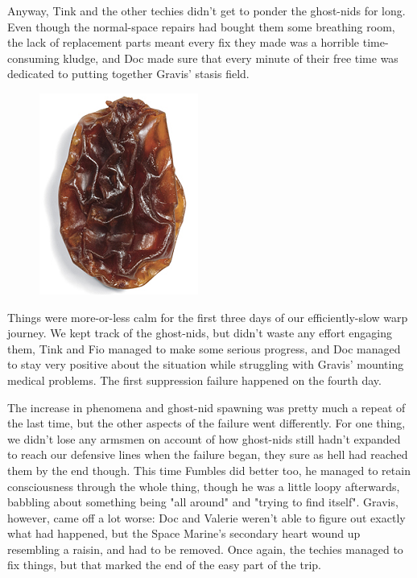 Anyway, Tink and the other techies didn't get to ponder the ghost-nids for long. 
Even though the normal-space repairs had bought them some breathing room, the lack of replacement parts meant every fix they made was a horrible time-consuming kludge, and Doc made sure that every minute of their free time was dedicated to putting together Gravis' stasis field.

\begin{figure}
	\begin{center}
		\includegraphics[width=\figwidth]{pics/15/35.png}
	\end{center}
\end{figure}
Things were more-or-less calm for the first three days of our efficiently-slow warp journey. 
We kept track of the ghost-nids, but didn't waste any effort engaging them, Tink and Fio managed to make some serious progress, and Doc managed to stay very positive about the situation while struggling with Gravis' mounting medical problems. 
The first suppression failure happened on the fourth day.

The increase in phenomena and ghost-nid spawning was pretty much a repeat of the last time, but the other aspects of the failure went differently. 
For one thing, we didn't lose any armsmen on account of how ghost-nids still hadn't expanded to reach our defensive lines when the failure began, they sure as hell had reached them by the end though. 
This time Fumbles did better too, he managed to retain consciousness through the whole thing, though he was a little loopy afterwards, babbling about something being "all around" and "trying to find itself". 
Gravis, however, came off a lot worse: 
Doc and Valerie weren't able to figure out exactly what had happened, but the Space Marine's secondary heart wound up resembling a raisin, and had to be removed. 
Once again, the techies managed to fix things, but that marked the end of the easy part of the trip.

